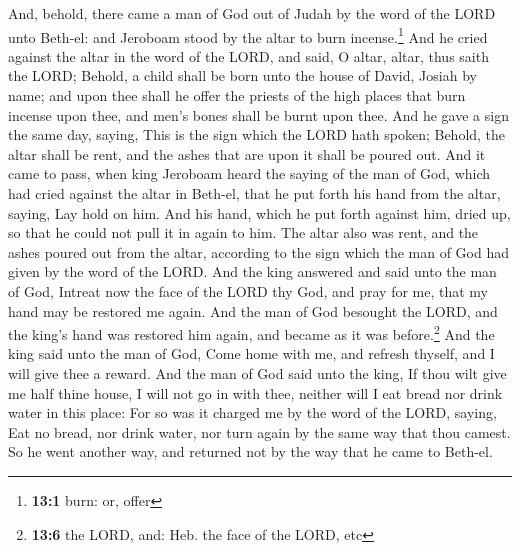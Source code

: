  And, behold, there came a man of God out of Judah by the
word of the LORD unto Beth-el: and Jeroboam stood by the altar to burn
incense.\footnote{\textbf{13:1} burn: or, offer}  And he
cried against the altar in the word of the LORD, and said, O altar,
altar, thus saith the LORD; Behold, a child shall be born unto the house
of David, Josiah by name; and upon thee shall he offer the priests of
the high places that burn incense upon thee, and men's bones shall be
burnt upon thee.  And he gave a sign the same day, saying,
This is the sign which the LORD hath spoken; Behold, the altar shall be
rent, and the ashes that are upon it shall be poured out. 
And it came to pass, when king Jeroboam heard the saying of the man of
God, which had cried against the altar in Beth-el, that he put forth his
hand from the altar, saying, Lay hold on him. And his hand, which he put
forth against him, dried up, so that he could not pull it in again to
him.  The altar also was rent, and the ashes poured out
from the altar, according to the sign which the man of God had given by
the word of the LORD.  And the king answered and said unto
the man of God, Intreat now the face of the LORD thy God, and pray for
me, that my hand may be restored me again. And the man of God besought
the LORD, and the king's hand was restored him again, and became as it
was before.\footnote{\textbf{13:6} the LORD, and: Heb. the face of the
  LORD, etc}  And the king said unto the man of God, Come
home with me, and refresh thyself, and I will give thee a reward.
 And the man of God said unto the king, If thou wilt give
me half thine house, I will not go in with thee, neither will I eat
bread nor drink water in this place:  For so was it
charged me by the word of the LORD, saying, Eat no bread, nor drink
water, nor turn again by the same way that thou camest. 
So he went another way, and returned not by the way that he came to
Beth-el.

